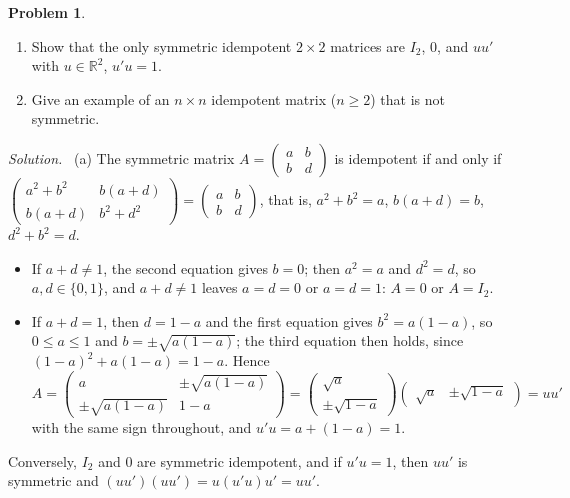 \documentclass[12pt]{article}
\newcommand{\R}{\mathbb R}
\theoremstyle{definition}
\newtheorem{problem}{Problem}
\newenvironment{solution}{\par\noindent\textit{Solution.}\ }{\par\smallskip}
\begin{document}
\begin{problem}\label{r1-ex-idempotent}
\begin{enumerate}
\item Show that the only symmetric idempotent \(2\times2\) matrices are \(I_2\), \(0\), and
\(uu'\) with \(u\in\R^2\), \(u'u=1\).
\item Give an example of an \(n\times n\) idempotent matrix (\(n\geqslant2\)) that is not
symmetric.
\end{enumerate}
\end{problem}
\begin{solution}
(a) The symmetric matrix \(A=\left(\begin{smallmatrix}a&b\\b&d\end{smallmatrix}\right)\) is
idempotent if and only if
\(\left(\begin{smallmatrix}a^2+b^2&b(a+d)\\b(a+d)&b^2+d^2\end{smallmatrix}\right)=\left(\begin{smallmatrix}a&b\\b&d\end{smallmatrix}\right)\),
that is, \(a^2+b^2=a\), \(b(a+d)=b\), \(d^2+b^2=d\).
\begin{itemize}
\item If \(a+d\ne1\), the second equation gives \(b=0\); then \(a^2=a\) and \(d^2=d\), so
\(a,d\in\{0,1\}\), and \(a+d\ne1\) leaves \(a=d=0\) or \(a=d=1\): \(A=0\) or \(A=I_2\).
\item If \(a+d=1\), then \(d=1-a\) and the first equation gives \(b^2=a(1-a)\), so
\(0\leqslant a\leqslant1\) and \(b=\pm\sqrt{a(1-a)}\); the third equation then holds, since
\((1-a)^2+a(1-a)=1-a\). Hence
\[
A=\begin{pmatrix}a&\pm\sqrt{a(1-a)}\\\pm\sqrt{a(1-a)}&1-a\end{pmatrix}
=\begin{pmatrix}\sqrt a\\\pm\sqrt{1-a}\end{pmatrix}\begin{pmatrix}\sqrt a&\pm\sqrt{1-a}\end{pmatrix}=uu'
\]
with the same sign throughout, and \(u'u=a+(1-a)=1\).
\end{itemize}
Conversely, \(I_2\) and \(0\) are symmetric idempotent, and if \(u'u=1\), then \(uu'\)
is symmetric and \((uu')(uu')=u(u'u)u'=uu'\).


\end{solution}
\end{document}
